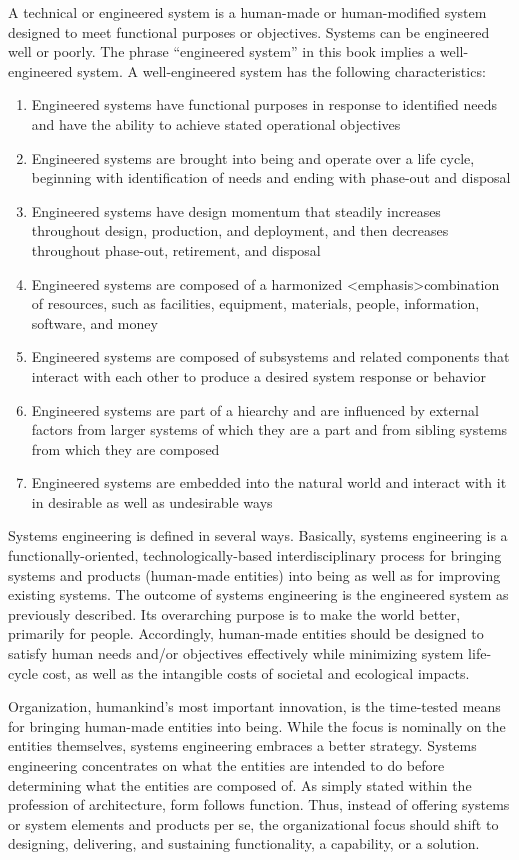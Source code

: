 A technical or engineered system is a human-made or human-modified system designed to meet functional purposes or objectives. Systems can be engineered well or poorly. The phrase ``engineered system'' in this book implies a well-engineered system. A well-engineered system has the following characteristics:

\begin{enumerate}
\item Engineered systems have functional purposes in response to identified needs and have the ability to achieve stated operational objectives
\item Engineered systems are brought into being and operate over a life cycle, beginning with identification of needs and ending with phase-out and disposal
\item Engineered systems have design momentum that steadily increases throughout design, production, and deployment, and then decreases throughout phase-out, retirement, and disposal
\item Engineered systems are composed of a harmonized <emphasis>combination of resources, such as facilities, equipment, materials, people, information, software, and money
\item Engineered systems are composed of subsystems and related components that interact with each other to produce a desired system response or behavior
\item Engineered systems are part of a hiearchy and are influenced by external factors from larger systems of which they are a part and from sibling systems from which they are composed
\item Engineered systems are embedded into the natural world and interact with it in desirable as well as undesirable ways
\end{enumerate}

Systems engineering is defined in several ways. Basically, systems engineering is a functionally-oriented, technologically-based interdisciplinary process for bringing systems and products (human-made entities) into being as well as for improving existing systems. The outcome of systems engineering is the engineered system as previously described. Its overarching purpose is to make the world better, primarily for people. Accordingly, human-made entities should be designed to satisfy human needs and/or objectives effectively while minimizing system life-cycle cost, as well as the intangible costs of societal and ecological impacts.

Organization, humankind’s most important innovation, is the time-tested means for bringing human-made entities into being. While the focus is nominally on the entities themselves, systems engineering embraces a better strategy. Systems engineering concentrates on what the entities are intended to do before determining what the entities are composed of. As simply stated within the profession of architecture, form follows function. Thus, instead of offering systems or system elements and products per se, the organizational focus should shift to designing, delivering, and sustaining functionality, a capability, or a solution.

